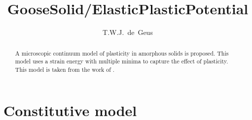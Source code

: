 \documentclass[times,namecite]{goose-article}
\title{%
  GooseSolid/ElasticPlasticPotential
}
\author{T.W.J.~de~Geus}
\begin{document}
\maketitle

\begin{abstract}
A microscopic continuum model of plasticity in amorphous solids is proposed. This model uses a strain energy with multiple minima to capture the effect of plasticity. This model is taken from the work of \citet{Jagla2017}.
\end{abstract}


\setcounter{tocdepth}{2}
\tableofcontents

\vfill\newpage
\section{Constitutive model}
\end{document}
